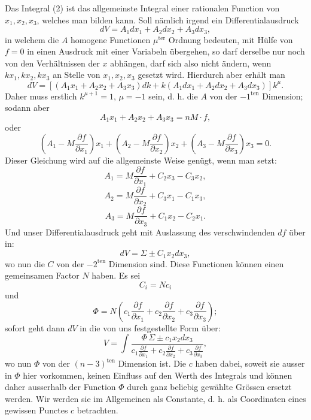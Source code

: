 \documentclass[10pt]{article}
\begin{document}
Das Integral (2) ist das allgemeinste Integral einer rationalen Function von $x_1,x_2,x_3$, welches man bilden kann. Soll nämlich irgend ein Differentialausdruck
\[
dV=A_1dx_1+A_2dx_2+A_3dx_3,
\]
in welchem die $A$ homogene Functionen $\mu^{\mathrm{ter}}$ Ordnung bedeuten, mit Hülfe von $f=0$ in einen Ausdruck mit einer Variabeln übergehen, so darf derselbe nur noch von den Verhältnissen der $x$ abhängen, darf sich also nicht ändern, wenn $kx_1,kx_2,kx_3$ an Stelle von $x_1,x_2,x_3$ gesetzt wird. Hierdurch aber erhält man
\[
dV=[(A_1x_1+A_2x_2+A_3x_3)dk+k(A_1dx_1+A_2dx_2+A_3dx_3)]k^\mu.
\]
Daher muss erstlich $k^{\mu+1}=1$, $\mu=-1$ sein, d. h. die $A$ von der $-1^{\mathrm{ten}}$ Dimension; sodann aber
\[
A_1x_1+A_2x_2+A_3x_3=nM\cdot f,
\]
oder
\[
\left(A_1-M\frac{\partial f}{\partial x_1}\right)x_1+
\left(A_2-M\frac{\partial f}{\partial x_2}\right)x_2+
\left(A_3-M\frac{\partial f}{\partial x_3}\right)x_3=0.
\]
Dieser Gleichung wird auf die allgemeinste Weise genügt, wenn man setzt:
\[
A_1=M\frac{\partial f}{\partial x_1}+C_2x_3-C_3x_2,
\]
\[
A_2=M\frac{\partial f}{\partial x_2}+C_3x_1-C_1x_3,
\]
\[
A_3=M\frac{\partial f}{\partial x_3}+C_1x_2-C_2x_1.
\]
Und unser Differentialausdruck geht mit Auslassung des verschwindenden $df$ über in:
\[
dV=\Sigma\pm C_1x_2dx_3,
\]
wo nun die $C$ von der $-2^{\mathrm{ten}}$ Dimension sind. Diese Functionen können einen gemeinsamen Factor $N$ haben. Es sei
\[
C_i=Nc_i
\]
und
\[
\Phi=N\left(c_1\frac{\partial f}{\partial x_1}+c_2\frac{\partial f}{\partial x_2}+c_3\frac{\partial f}{\partial x_3}\right);
\]
sofort geht dann $dV$ in die von uns festgestellte Form über:
\[
V=\int\frac{\Phi\,\Sigma\pm c_1x_2dx_3}{c_1\frac{\partial f}{\partial x_1}+c_2\frac{\partial f}{\partial x_2}+c_3\frac{\partial f}{\partial x_3}},
\]
wo nun $\Phi$ von der $(n-3)^{\mathrm{ten}}$ Dimension ist. Die $c$ haben dabei, soweit sie ausser in $\Phi$ hier vorkommen, keinen Einfluss auf den Werth des Integrals und können daher ausserhalb der Function $\Phi$ durch ganz beliebig gewählte Grössen ersetzt werden. Wir werden sie im Allgemeinen als Constante, d. h. als Coordinaten eines gewissen Punctes $c$ betrachten.
\end{document}
